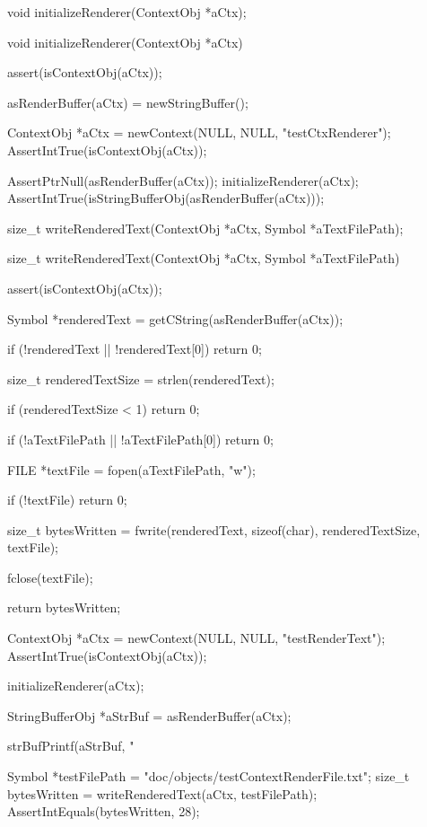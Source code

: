 \startCHeader
void initializeRenderer(ContextObj *aCtx);
\stopCHeader

\startCCode
void initializeRenderer(ContextObj *aCtx) {
  assert(isContextObj(aCtx));
  
  asRenderBuffer(aCtx) = newStringBuffer();
}
\stopCCode


\startCTest
  ContextObj *aCtx = newContext(NULL, NULL, "testCtxRenderer");
  AssertIntTrue(isContextObj(aCtx));
  
  AssertPtrNull(asRenderBuffer(aCtx));
  initializeRenderer(aCtx);
  AssertIntTrue(isStringBufferObj(asRenderBuffer(aCtx)));
\stopCTest
\stopTestCase
\stopTestSuite

\startTestSuite[writeRenderedText]

\startCHeader
size_t writeRenderedText(ContextObj *aCtx, Symbol *aTextFilePath);
\stopCHeader

\startCCode
size_t writeRenderedText(ContextObj *aCtx, Symbol *aTextFilePath) {
  assert(isContextObj(aCtx));

  Symbol *renderedText = getCString(asRenderBuffer(aCtx));
  
  if (!renderedText || !renderedText[0]) return 0;
  
  size_t renderedTextSize = strlen(renderedText);

  if (renderedTextSize < 1) return 0;
  
  if (!aTextFilePath || !aTextFilePath[0]) return 0;
  
  FILE *textFile = fopen(aTextFilePath, "w");
  
  if (!textFile) return 0;

  size_t bytesWritten =
    fwrite(renderedText, sizeof(char), renderedTextSize, textFile);
  
  fclose(textFile);
  
  return bytesWritten;
}
\stopCCode


\startCTest
  ContextObj *aCtx = newContext(NULL, NULL, "testRenderText");
  AssertIntTrue(isContextObj(aCtx));
  
  initializeRenderer(aCtx);
  
  StringBufferObj *aStrBuf = asRenderBuffer(aCtx);
  
  strBufPrintf(aStrBuf, "%
  
  Symbol *testFilePath = "doc/objects/testContextRenderFile.txt";
  size_t bytesWritten  = writeRenderedText(aCtx, testFilePath);
  AssertIntEquals(bytesWritten, 28);
  
